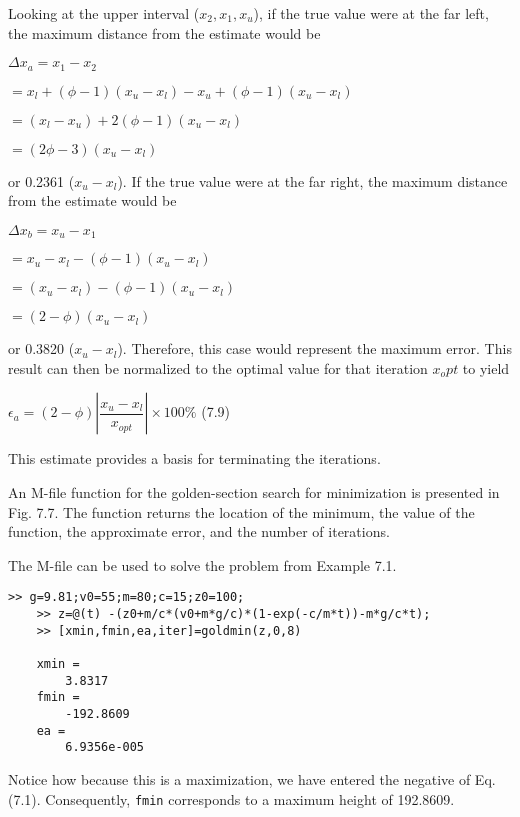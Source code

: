 \documentclass[../main.tex]{subfiles}
\begin{document}
Looking at the upper interval ($x_2, x_1, x_u$), if the true value were at the far left, the maximum
distance from the estimate would be

$\Delta x_a = x_1 - x_2$
\medskip

$=x_l + (\phi - 1)(x_u - x_l ) - x_u + (\phi - 1)(x_u - x_l )$
\medskip

$=(x_l - x_u) + 2(\phi - 1)(x_u - x_l )$
\medskip

$=(2\phi - 3)(x_u - x_l )$
\medskip

\noindent or 0.2361 ($x_u - x_l$). If the true value were at the far right, the maximum distance from the
estimate would be

$\Delta x_b = x_u - x_1$
\medskip

$=x_u - x_l - (\phi - 1)(x_u - x_l )$
\medskip

$=(x_u - x_l) - (\phi - 1)(x_u - x_l )$
\medskip

$=(2 -\phi)(x_u - x_l)$
\medskip

\noindent or 0.3820 ($x_u - x_l$). Therefore, this case would represent the maximum error. This result can
then be normalized to the optimal value for that iteration $x_opt$ to yield

$\epsilon_a = (2 - \phi)|\dfrac{x_u-x_l}{x_{opt}}|\times 100\% $ \hfill {(7.9)}

\noindent This estimate provides a basis for terminating the iterations.

An M-file function for the golden-section search for minimization is presented in
Fig. 7.7. The function returns the location of the minimum, the value of the function, the
approximate error, and the number of iterations.

The M-file can be used to solve the problem from Example 7.1.

\begin{lstlisting}[numbers=none,frame=none]
	>> g=9.81;v0=55;m=80;c=15;z0=100;
	>> z=@(t) -(z0+m/c*(v0+m*g/c)*(1-exp(-c/m*t))-m*g/c*t);
	>> [xmin,fmin,ea,iter]=goldmin(z,0,8)

	xmin =
		3.8317
	fmin =
		-192.8609
	ea =
		6.9356e-005
\end{lstlisting}

\noindent Notice how because this is a maximization, we have entered the negative of Eq. (7.1).
Consequently, \texttt{fmin} corresponds to a maximum height of 192.8609.
\end{document}
